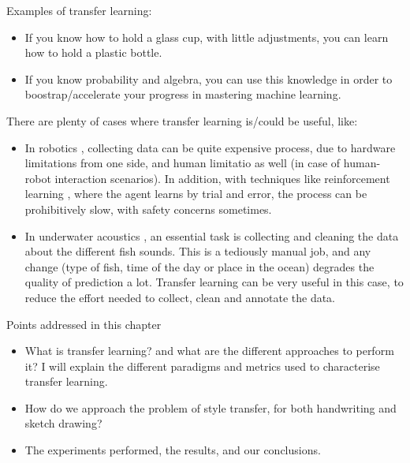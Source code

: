   \par Examples of transfer learning:
  \begin{itemize}
      \item If you know how to hold a glass cup, with little adjustments, you can learn how to hold a plastic bottle.
      \item If you know probability and algebra, you can use this knowledge in order to boostrap/accelerate your progress in mastering machine learning.
  \end{itemize}

  \par There are plenty of cases where transfer learning is/could be useful, like:
  \begin{itemize}
    \item In robotics \citep{konidaris2012robot,Konidaris:2012:TRL:2188385.2343689}, collecting data can be quite expensive process, due to hardware limitations from one side, and human limitatio as well (in case of human-robot interaction scenarios). In addition, with techniques like reinforcement learning \citep{sutton2018reinforcement}, where the agent learns by trial and error, the process can be prohibitively slow, with safety concerns sometimes.
    \item In underwater acoustics \citep{malfante2018automatic}, an essential task is collecting and cleaning the data about the different fish sounds. This is a tediously manual job, and any change (type of fish, time of the day or place in the ocean) degrades the quality of prediction a lot. Transfer learning can be very useful in this case, to reduce the effort needed to collect, clean and annotate the data.
  \end{itemize}

  \begin{mdframed}[backgroundcolor=blue!20]
      \begin{center}
          Points addressed in this chapter
      \end{center}

      \begin{itemize}
          \item What is transfer learning? and what are the different approaches to perform it? I will explain the different paradigms and metrics used to characterise transfer learning.
          \item How do we approach the problem of style transfer, for both handwriting and sketch drawing?
          \item The experiments performed, the results, and our conclusions.
      \end{itemize}
  \end{mdframed}

